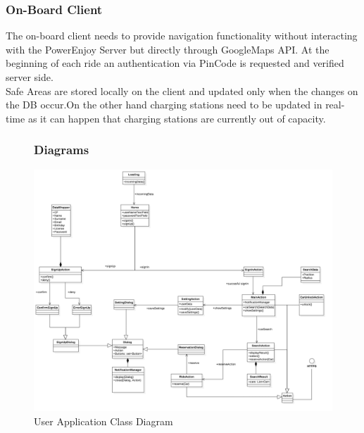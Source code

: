 \subsubsection{On-Board Client}
The on-board client needs to provide navigation functionality without interacting with the PowerEnjoy Server but directly through GoogleMaps API. At the beginning of each ride an authentication via PinCode is requested and verified server side.\\Safe Areas are stored locally on the client and updated only when the changes on the DB occur.On the other hand charging stations need to be updated in real-time as it can happen that charging stations are currently out of capacity.
\clearpage


\FloatBarrier
\begin{figure}
\subsubsection{Diagrams}
\includegraphics[scale=0.35]{Images/ClassDiagram/User.png}
\caption{User Application Class Diagram}
\end{figure}
\FloatBarrier


